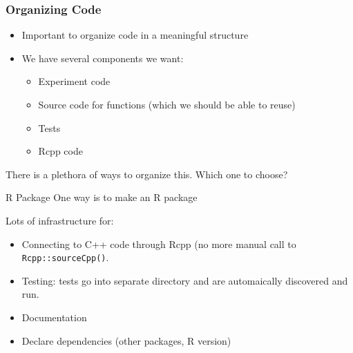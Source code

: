 \documentclass[aspectratio=1610,onlytextwidth]{beamer}
\begin{document}
\begin{frame}[c]
  \frametitle{Organizing Code}

  \begin{itemize}
    \item Important to organize code in a meaningful structure
    \item We have several components we want:
          \begin{itemize}
            \item Experiment code
            \item Source code for functions (which we should be able to reuse)
            \item Tests
            \item Rcpp code
          \end{itemize}
  \end{itemize}

  There is a plethora of ways to organize this. Which one to choose?

  \begin{block}{R Package}
    One way is to make an R package

    \medskip


    \medskip

    Lots of infrastructure for:
    \begin{itemize}
      \item Connecting to C++ code through Rcpp (no more manual call to \texttt{Rcpp::sourceCpp()}.
      \item Testing: tests go into separate directory and are automaically discovered and run.
      \item Documentation
      \item Declare dependencies (other packages, R version)
    \end{itemize}
  \end{block}
\end{frame}
\end{document}

